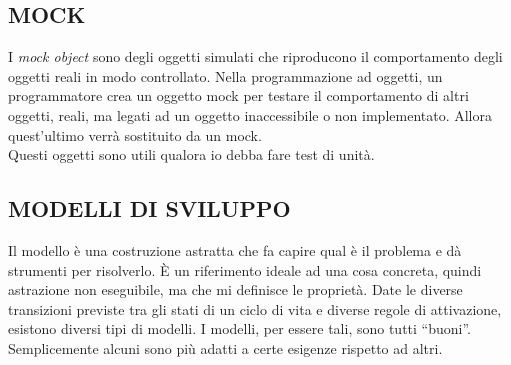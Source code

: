 		\subsection{MOCK}		\label{mock}
		I \textit{mock object} sono degli oggetti simulati che riproducono il comportamento degli oggetti reali in modo controllato. Nella programmazione ad oggetti, un programmatore crea un oggetto mock per testare il comportamento di altri oggetti, reali, ma legati ad un oggetto inaccessibile o non implementato. Allora quest'ultimo verrà sostituito da un mock. \\
		Questi oggetti sono utili qualora io debba fare test di unità.


		\subsection{MODELLI DI SVILUPPO}  \label{modelli}
		Il modello è una costruzione astratta che fa capire qual è il problema e dà strumenti per risolverlo. È un riferimento ideale ad una cosa concreta, quindi astrazione non eseguibile, ma che mi definisce le proprietà. Date le diverse transizioni previste tra gli stati di un ciclo di vita e diverse regole di attivazione, esistono diversi tipi di modelli.
		I modelli, per essere tali, sono tutti ``buoni''. Semplicemente alcuni sono più adatti a certe esigenze rispetto ad altri.
